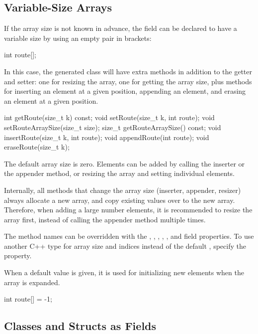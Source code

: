 \subsection{Variable-Size Arrays}
\label{sec:msg-defs:variable-size-arrays}

If the array size is not known in advance, the field can be declared
to have a variable size by using an empty pair in brackets:

\begin{msg}
int route[];
\end{msg}

In this case, the generated class will have extra methods in addition to the
getter and setter: one for resizing the array, one for getting the array size,
plus methods for inserting an element at a given position, appending an element,
and erasing an element at a given position.

\begin{cpp}
int getRoute(size_t k) const;
void setRoute(size_t k, int route);
void setRouteArraySize(size_t size);
size_t getRouteArraySize() const;
void insertRoute(size_t k, int route);
void appendRoute(int route);
void eraseRoute(size_t k);
\end{cpp}

The default array size is zero. Elements can be added by calling the inserter
or the appender method, or resizing the array and setting individual elements.

Internally, all methods that change the array size (inserter, appender, resizer)
always allocate a new array, and copy existing values over to the new array.
Therefore, when adding a large number elements, it is recommended to resize the
array first, instead of calling the appender method multiple times.

The method names can be overridden with the , ,
, , , 
and  field properties. To use another C++ type for array size and
indices instead of the default , specify the 
property.

When a default value is given, it is used for initializing new elements
when the array is expanded.

\begin{msg}
int route[] = -1;
\end{msg}


\subsection{Classes and Structs as Fields}
\label{sec:msg-defs:other-types-as-fields}


